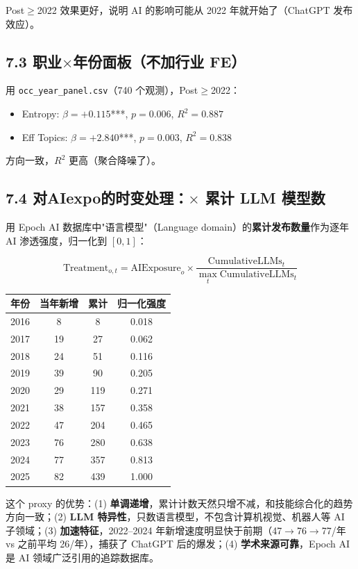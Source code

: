 \documentclass[12pt,a4paper]{article}
\begin{document}
Post$\geq$2022 效果更好，说明 AI 的影响可能从 2022 年就开始了（ChatGPT 发布效应）。

\subsection*{7.3 职业$\times$年份面板（不加行业 FE）}

用 \texttt{occ\_year\_panel.csv}（740 个观测），Post$\geq$2022：

\begin{itemize}
  \item Entropy: $\beta=+0.115$***, $p=0.006$, $R^2=0.887$
  \item Eff Topics: $\beta=+2.840$***, $p=0.003$, $R^2=0.838$
\end{itemize}

方向一致，$R^2$ 更高（聚合降噪了）。

\subsection*{7.4 对AIexpo的时变处理：$\times$ 累计 LLM 模型数}

用 Epoch AI 数据库中"语言模型"（Language domain）的\textbf{累计发布数量}作为逐年 AI 渗透强度，归一化到 $[0,1]$：

$$\text{Treatment}_{o,t} = \text{AIExposure}_o \times \frac{\text{CumulativeLLMs}_t}{\max_t \text{CumulativeLLMs}_t}$$

\begin{center}
\small
\begin{tabular}{cccc}
\toprule
年份 & 当年新增 & 累计 & 归一化强度 \\
\midrule
2016 & 8 & 8 & 0.018 \\
2017 & 19 & 27 & 0.062 \\
2018 & 24 & 51 & 0.116 \\
2019 & 39 & 90 & 0.205 \\
2020 & 29 & 119 & 0.271 \\
2021 & 38 & 157 & 0.358 \\
2022 & 47 & 204 & 0.465 \\
2023 & 76 & 280 & 0.638 \\
2024 & 77 & 357 & 0.813 \\
2025 & 82 & 439 & 1.000 \\
\bottomrule
\end{tabular}
\end{center}

这个 proxy 的优势：(1) \textbf{单调递增}，累计计数天然只增不减，和技能综合化的趋势方向一致；(2) \textbf{LLM 特异性}，只数语言模型，不包含计算机视觉、机器人等 AI 子领域；(3) \textbf{加速特征}，2022--2024 年新增速度明显快于前期（47$\rightarrow$76$\rightarrow$77/年 vs 之前平均 26/年），捕获了 ChatGPT 后的爆发；(4) \textbf{学术来源可靠}，Epoch AI 是 AI 领域广泛引用的追踪数据库。
\end{document}

